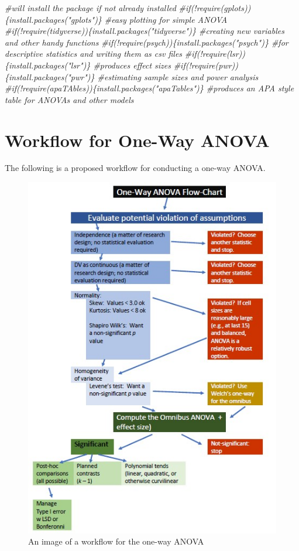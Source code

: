\documentclass[
  english,
]{book}
\newenvironment{Shaded}{\begin{snugshade}}{\end{snugshade}}
\newcommand{\CommentTok}[1]{\textcolor[rgb]{0.56,0.35,0.01}{\textit{#1}}}
\begin{document}
\begin{Shaded}
\begin{Highlighting}[]
\CommentTok{\#will install the package if not already installed}
\CommentTok{\#if(!require(gplots))\{install.packages("gplots")\} \#easy plotting for simple ANOVA}
\CommentTok{\#if(!require(tidyverse))\{install.packages("tidyverse")\} \#creating new variables and other handy functions}
\CommentTok{\#if(!require(psych))\{install.packages("psych")\} \#for descriptive statistics and writing them as csv files}
\CommentTok{\#if(!require(lsr))\{install.packages("lsr")\} \#produces effect sizes}
\CommentTok{\#if(!require(pwr))\{install.packages("pwr")\} \#estimating sample sizes and power analysis}
\CommentTok{\#if(!require(apaTAbles))\{install.packages("apaTables")\} \#produces an APA style table for ANOVAs and other models}
\end{Highlighting}
\end{Shaded}

\hypertarget{workflow-for-one-way-anova}{%
\section{Workflow for One-Way ANOVA}\label{workflow-for-one-way-anova}}

The following is a proposed workflow for conducting a one-way ANOVA.

\begin{figure}
\centering
\includegraphics{images/OnewayWrkFlw.jpg}
\caption{An image of a workflow for the one-way ANOVA}
\end{figure}
\end{document}
